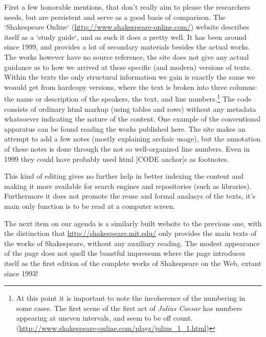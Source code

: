 First a few honorable mentions, that don't really aim to please the researchers needs, but are persistent and serve as a good basis of comparison. The `Shakespeare Online` (\url{http://www.shakespeare-online.com/}) website describes itself as a `study guide`, and as such it does a pretty well. It has been around since 1999, and provides a lot of secondary materials besides the actual works. The works however have no source reference, the site does not give any actual guidance as to how we arrived at these specific (and modern) versions of texts. Within the texts the only structural information we gain is exactly the same we wouuld get from hardcopy versions, where the text is broken into three columns: the name or description of the speakers, the text, and line numbers.\footnote{At this point it is important to note the incoherence of the numbering in some cases. The first scene of the first act of \textit{Julius Caesar} has numbers appearing at uneven intervals, and seem to be off count. (\url{http://www.shakespeare-online.com/plays/julius_1_1.html})} The code consists of ordinary html markup (using tables and rows) without any metadata whatsoever indicating the nature of the content. One example of the conventional apparatus can be found reading the works published here. The site makes an attempt to add a few notes (mostly explaining archaic usage), but the annotation of these notes is done through the not so well-organized line numbers. Even in 1999 they could have probably used html [CODE anchor]s as footnotes.

This kind of editing gives no further help in better indexing the content and making it more available for search engines and repositories (such as libraries). Furthermore it does not promote the reuse and formal analasys of the texts, it's main only function is to be read at a computer screen.

The next item on our agenda is a similarly built website to the previous one, with the distinction that \url{http://shakespeare.mit.edu/} only provides the main texts of the works of Shakespeare, without any auxiliary reading. The modest appearance of the page does not quell the boastful impressum where the page introduces itself as the first edition of the complete works of Shakespeare on the Web, extant since 1993! 

